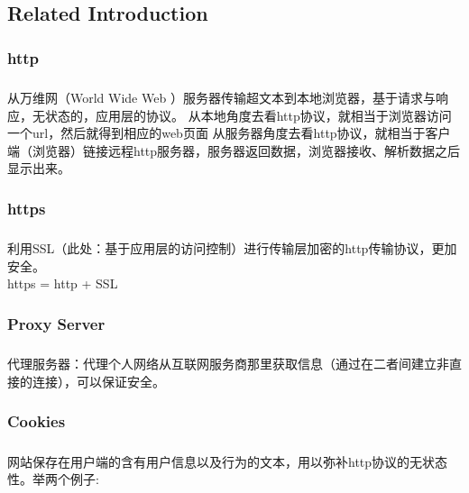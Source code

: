 \documentclass{article}
\begin{document}
	\subsection{Related Introduction}

	\subsubsection{http}
	\subparagraph{}
	\begin{CJK}{UTF8}{gbsn}
		从万维网（World Wide Web ）服务器传输超文本到本地浏览器，基于请求与响应，无状态的，应用层的协议。
从本地角度去看http协议，就相当于浏览器访问一个url，然后就得到相应的web页面
从服务器角度去看http协议，就相当于客户端（浏览器）链接远程http服务器，服务器返回数据，浏览器接收、解析数据之后显示出来。 
	\end{CJK}{}
	\subsubsection{https}
	\subparagraph{}
	\begin{CJK}{UTF8}{gbsn}
		利用SSL（此处：基于应用层的访问控制）进行传输层加密的http传输协议，更加安全。\\ 
		https = http + SSL
	\end{CJK}{}
	\subsubsection{Proxy Server}
	\subparagraph{}
	\begin{CJK}{UTF8}{gbsn}
		代理服务器：代理个人网络从互联网服务商那里获取信息（通过在二者间建立非直接的连接），可以保证安全。
	\end{CJK}{}
	\subsubsection{Cookies}
	\subparagraph{}
	\begin{CJK}{UTF8}{gbsn}
		网站保存在用户端的含有用户信息以及行为的文本，用以弥补http协议的无状态性。举两个例子:
	\end{CJK}{}
\end{document}
